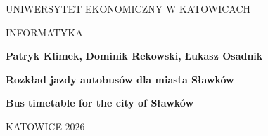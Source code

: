 
\pagestyle{empty}
\noindent
\begin{center}
    UNIWERSYTET EKONOMICZNY W KATOWICACH
\end{center}

\begin{center}
    INFORMATYKA
\end{center}

\vfill
\begin{center}
    \textbf{Patryk Klimek,}
    \textbf{Dominik Rekowski,}
    \textbf{Łukasz Osadnik}
\end{center}
\vfill

\begin{center}
    \Large
	\textbf{Rozkład jazdy autobusów dla miasta Sławków}
\end{center}

\begin{center}
	\textbf{Bus timetable for the city of Sławków}
\end{center}

\vfill
\vfill
\vfill


\vfill
\begin{center}
    KATOWICE 2026
\end{center}

\newpage 

\tableofcontents

